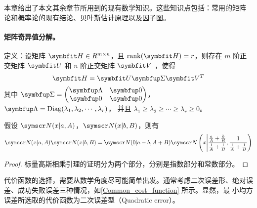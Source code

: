 \documentclass[type=master]{../gdutthesis}
\newcommand{\mbfit}{\symbfit}
\newcommand{\mbf}{\symbfup}
\newcommand{\mscr}{\symscr}
\DeclareMathOperator*{\Diag}{Diag}
\begin{document}

本章给出了本文其余章节所用到的现有数学知识。这些知识点包括：常用的矩阵
论和概率论的现有结论、贝叶斯估计原理以及因子图。


\paragraph{矩阵奇异值分解。}

定义：设矩阵 $\mbfit H \in R^{m \times n}$，且 $\rank(\mbfit H) = r$，则存在
$m$ 阶正交矩阵 $\mbfit U$ 和 $n$ 阶正交矩阵 $\mbfit V$ ，使得
\begin{equation}
  \mbfit H = \mbfit U \mbf \Sigma \mbfit V^T
\end{equation}
其中 $\mbf \Sigma = \begin{pmatrix}
  \mbf \Lambda & \mbf 0 \\
  \mbf 0       & \mbf 0
\end{pmatrix}$，
$\mbf \Lambda = \Diag ( \lambda_1, \lambda_2, \cdots, \lambda_r )$，
并且 $\lambda_1 \geqslant \lambda_2 \geqslant \cdots \geqslant \lambda_r \geqslant 0$。

\begin{lemma}[标量高斯相乘引理]
  假设 $\mscr N ( x | a, A )$，$\mscr N ( x | b, B )$，则有
  \begin{equation}
    \mscr N ( x | a, A ) \mscr N ( x | b, B ) = \mscr N ( 0 | a - b, A + B ) \mscr N \left( x \middle| \frac{ \frac{a}{A} + \frac{b}{B} }{ \frac{1}{A} + \frac{1}{B} }, \frac{ 1 }{ \frac{1}{A} + \frac{1}{B} } \right)
  \end{equation}
\end{lemma}
\begin{proof}
  标量高斯相乘引理的证明分为两个部分，分别是指数部分和常数部分。
\end{proof}


代价函数的选择，需要从数学角度尽可能简单出发。通常考虑二次误差形、绝对误
差、成功失败误差三种情况，如\autoref{Common_cost_function} 所示。显然，最
小均方误差所选取的代价函数为二次误差型（Quadratic error）。

\begin{figure}[htbp]
  \quad
  \quad
  \label{Common_cost_function}
\end{figure}
\end{document}
